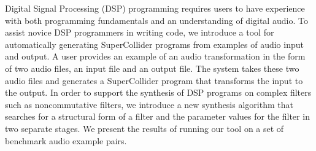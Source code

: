 Digital Signal Processing (DSP) programming requires users to have experience with both programming fundamentals and an understanding of digital audio.
To assist novice DSP programmers in writing code, we introduce a tool for automatically generating SuperCollider programs from examples of audio input and output.
A user provides an example of an audio transformation in the form of two audio files, an input file and an output file.
The system takes these two audio files and generates a SuperCollider program that transforms the input to the output.
In order to support the synthesis of DSP programs on complex filters such as noncommutative filters, we introduce a new synthesis algorithm that searches for a structural form of a filter and the parameter values for the filter in two separate stages.
We present the results of running our tool on a set of benchmark audio example pairs.
